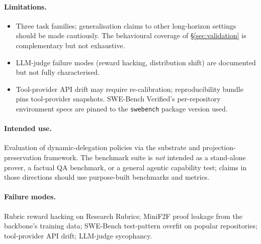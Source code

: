 \documentclass{article}
\begin{document}
\paragraph{Limitations.}
\begin{itemize}
  \item Three task families; generalisation claims to other
    long-horizon settings should be made cautiously. The
    behavioural coverage of \S\ref{sec:validation} is complementary
    but not exhaustive.
  \item LLM-judge failure modes (reward hacking, distribution
    shift) are documented but not fully characterised.
  \item Tool-provider API drift may require re-calibration;
    reproducibility bundle pins tool-provider snapshots. SWE-Bench
    Verified's per-repository environment specs are pinned to the
    \texttt{swebench} package version used.
\end{itemize}

\paragraph{Intended use.}
Evaluation of dynamic-delegation policies via the substrate and
projection-preservation framework. The benchmark suite is \emph{not}
intended as a stand-alone prover, a factual QA benchmark, or a
general agentic capability test; claims in those directions should
use purpose-built benchmarks and metrics.

\paragraph{Failure modes.}
Rubric reward hacking on Research Rubrics; MiniF2F proof leakage
from the backbone's training data; SWE-Bench test-pattern overfit
on popular repositories; tool-provider API drift; LLM-judge
sycophancy.




\end{document}
